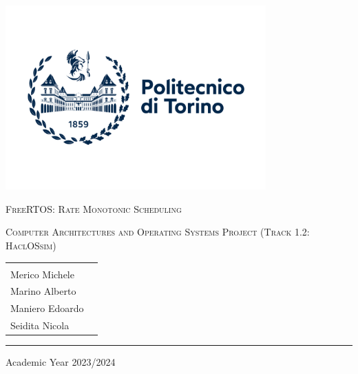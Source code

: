 \documentclass{article}
\begin{document}
\begin{titlepage}
    \centering
    \includegraphics[width=0.75\textwidth]{img/logo.png}\par
    \vspace{0.5cm}
    {\scshape\Huge FreeRTOS: Rate Monotonic Scheduling \par}
    \vspace{1cm}
    {\scshape\LARGE Computer Architectures and Operating Systems Project (Track 1.2: HaclOSsim) \par}
    \vspace{2cm}
    \begin{tabularx}{\textwidth}{Xr}
        \begin{minipage}[t]{0.45\textwidth}
            \raggedright
            {\Large Authors: \\ Merico Michele \\ Marino Alberto \\ Maniero Edoardo \\ Seidita Nicola \par}
        \end{minipage} &
        \begin{minipage}[t]{0.45\textwidth}
            \raggedleft
            {\Large  \par}
        \end{minipage}
    \end{tabularx}
    \vfill
    \hrule height 0.5pt
    \vspace{0.5cm}
    {\Large Academic Year 2023/2024 \par}
\end{titlepage}





\end{document}
